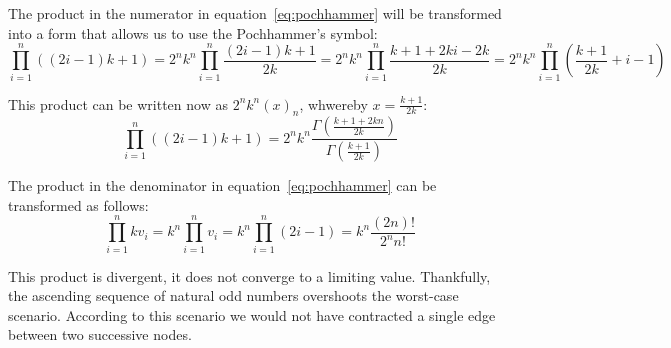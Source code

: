 The product in the numerator in equation~\ref{eq:pochhammer} will be transformed into a form that allows us to use the Pochhammer’s symbol:
\[\prod_{i=1}^{n}\left((2i-1)k+1\right)=2^nk^n\prod_{i=1}^{n}\frac{(2i-1)k+1}{2k}=2^nk^n\prod_{i=1}^{n}\frac{k+1+2ki-2k}{2k}=2^nk^n\prod_{i=1}^{n}\left(\frac{k+1}{2k}+i-1\right)\]

This product can be written now as $2^nk^n(x)_n$, whwereby $x=\frac{k+1}{2k}$:
\[\prod_{i=1}^{n}\left((2i-1)k+1\right)=2^nk^n\frac{\Gamma\left(\frac{k+1+2kn}{2k}\right)}{\Gamma\left(\frac{k+1}{2k}\right)}\]

The product in the denominator in equation~\ref{eq:pochhammer} can be transformed as follows:
\[\prod_{i=1}^{n}kv_i=k^n\prod_{i=1}^{n}v_i=k^n\prod_{i=1}^{n}(2i-1)=k^n\frac{(2n)!}{2^nn!}\]

\par\medskip
This product is divergent, it does not converge to a limiting value. Thankfully, the ascending sequence of natural odd numbers overshoots the worst-case scenario. According to this scenario we would not have contracted a single edge between two successive nodes.
